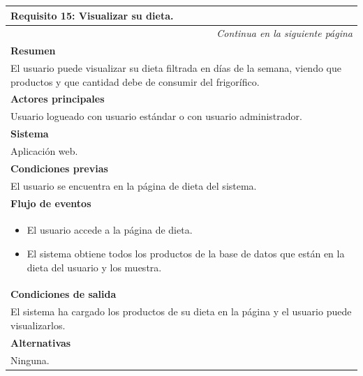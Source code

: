 \begin{longtable}{|p{}|}
\hline
 \rowcolor[gray]{.5}
 \color{white}\textbf{Requisito 15: Visualizar su dieta.} \\
\hline
\endfirsthead
\endhead
\hline \multicolumn{1}{r}{\textit{Continua en la siguiente página}} \\
\endfoot
\endlastfoot
    \rowcolor[gray]{.9}
     \textbf{Resumen} \\
     \hline
     El usuario puede visualizar su dieta filtrada en días de la semana, viendo que productos y que cantidad debe de consumir del frigorífico. \\
     \hline
     \rowcolor[gray]{.9}
     \textbf{Actores principales} \\
     \hline
     Usuario logueado con usuario estándar o con usuario administrador. \\
     \hline
     \rowcolor[gray]{.9}
     \textbf{Sistema} \\
     \hline
     Aplicación web. \\
     \hline
     \rowcolor[gray]{.9}
     \textbf{Condiciones previas} \\
     \hline
     El usuario se encuentra en la página de dieta del sistema. \\
     \hline
     \rowcolor[gray]{.9}
     \textbf{Flujo de eventos}  \\
     \hline
      \begin{itemize}
         \item El usuario accede a la página de dieta.
         \item El sistema obtiene todos los productos de la base de datos que están en la dieta del usuario y los muestra.
     \end{itemize} \\
     \hline
     \rowcolor[gray]{.9}
     \textbf{Condiciones de salida} \\
     \hline
     El sistema ha cargado los productos de su dieta en la página y el usuario puede visualizarlos. \\
     \hline
     \rowcolor[gray]{.9}
     \textbf{Alternativas}  \\
     \hline
      Ninguna.\\
     \hline
\end{longtable}


